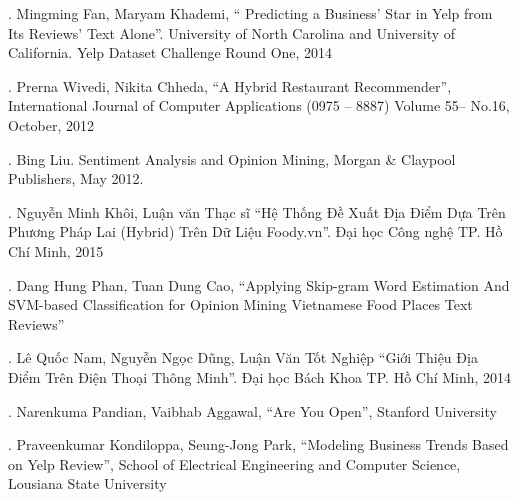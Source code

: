 \documentclass[12pt]{extarticle}
\begin{document}
		\par [15].	Mingming Fan, Maryam Khademi, “ Predicting a Business’ Star in Yelp from Its Reviews’ Text Alone”. University of North Carolina and University of California. Yelp Dataset Challenge Round One, 2014
		\par [16].	Prerna Wivedi, Nikita Chheda, “A Hybrid Restaurant Recommender”, International Journal of Computer Applications (0975 – 8887) Volume 55– No.16, October, 2012
		\par [17].	Bing Liu. Sentiment Analysis and Opinion Mining, Morgan \& Claypool Publishers, May 2012.
		\par [18].	Nguyễn Minh Khôi, Luận văn Thạc sĩ “Hệ Thống Đề Xuất Địa Điểm Dựa Trên Phương Pháp Lai (Hybrid) Trên Dữ Liệu Foody.vn”. Đại học Công nghệ TP. Hồ Chí Minh, 2015
		\par [19].	Dang Hung Phan, Tuan Dung Cao, “Applying Skip-gram Word Estimation And SVM-based Classification for Opinion Mining Vietnamese Food Places Text Reviews”
		\par [20].	Lê Quốc Nam, Nguyễn Ngọc Dũng, Luận Văn Tốt Nghiệp “Giới Thiệu Địa Điểm Trên Điện Thoại Thông Minh”. Đại học Bách Khoa TP. Hồ Chí Minh, 2014
		\par [21].	Narenkuma Pandian, Vaibhab Aggawal, “Are You Open”, Stanford University
		\par [22].	Praveenkumar Kondiloppa, Seung-Jong Park, “Modeling Business Trends Based on Yelp Review”, School of Electrical Engineering and Computer Science, Lousiana State University

%		 
%		
\end{document}
